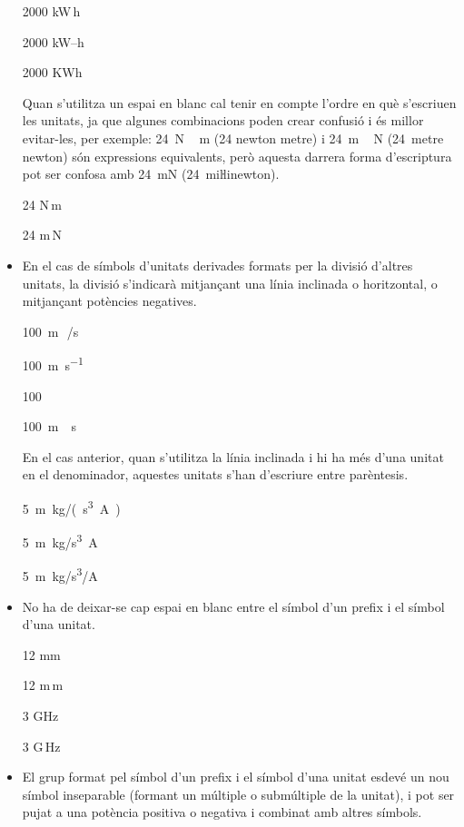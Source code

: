 \begin{itemize}
\textcolor{Green}\faCheckSquare{} 2000 kW\,h

\textcolor{Red}\faTimesCircle{} 2000 kW--h

\textcolor{Red}\faTimesCircle{} 2000 KWh

Quan s'utilitza un espai en blanc cal tenir en compte  l'ordre en què s'escriuen
les unitats, ja que algunes combinacions poden crear confusió i
és millor evitar-les, per exemple: \SI{24}{N\,m} (24 newton metre) i
\SI{24}{m\,N} (24~metre newton) són expressions equivalents, però
aquesta darrera forma d'escriptura pot ser confosa amb \SI{24}{mN} (24~miŀlinewton).

\textcolor{Green}\faCheckSquare{} 24 N\,m

\textcolor{Blue}\faExclamationTriangle{} 24 m\,N

\item En el cas de símbols d'unitats derivades formats per la divisió
d'altres unitats, la divisió s'indicarà mitjançant una línia
inclinada o horitzontal, o mitjançant potències negatives.

\textcolor{Green}\faCheckSquare{} \SI{100}{m\,/s}

\textcolor{Green}\faCheckSquare{} \SI{100}{m.s^{-1}}

\textcolor{Green}\faCheckSquare{} \SI{100}{}

\textcolor{Red}\faTimesCircle{} \SI{100}{m\div s}

En el cas anterior, quan s'utilitza la línia inclinada i hi ha més
d'una unitat en el denominador, aquestes unitats s'han d'escriure
entre parèntesis.

\textcolor{Green}\faCheckSquare{} \SI{5}{m.kg/(s^3.A)}

\textcolor{Red}\faTimesCircle{} \SI{5}{m.kg/s^3.A}

\textcolor{Red}\faTimesCircle{} \SI{5}{m.kg/s^3/A}


\item No ha de deixar-se cap espai en blanc entre el símbol d'un prefix i
el símbol d'una unitat.

\textcolor{Green}\faCheckSquare{} 12 mm

\textcolor{Red}\faTimesCircle{} 12 m\,m

\textcolor{Green}\faCheckSquare{}  3 GHz

\textcolor{Red}\faTimesCircle{}  3 G\,Hz


\item El grup format pel símbol d'un prefix i el símbol d'una unitat
esdevé un nou símbol inseparable (formant un múltiple o submúltiple
de la unitat), i pot ser pujat a una potència positiva o negativa i
combinat amb altres símbols.


\end{itemize}

